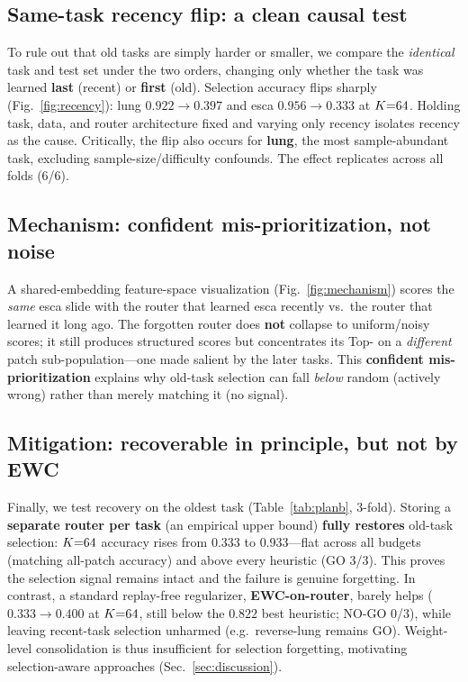 \subsection{Same-task recency flip: a clean causal test}
\label{sec:recency}
To rule out that old tasks are simply harder or smaller, we compare the
\emph{identical} task and test set under the two orders, changing only whether
the task was learned \textbf{last} (recent) or \textbf{first} (old). Selection
accuracy flips sharply (Fig.~\ref{fig:recency}): lung $0.922\to0.397$ and esca
$0.956\to0.333$ at $K{=}64$. Holding task, data, and router architecture fixed
and varying only recency isolates recency as the cause. Critically, the flip
also occurs for \textbf{lung}, the most sample-abundant task, excluding
sample-size/difficulty confounds. The effect replicates across all folds (6/6).

\subsection{Mechanism: confident mis-prioritization, not noise}
A shared-embedding feature-space visualization (Fig.~\ref{fig:mechanism}) scores
the \emph{same} esca slide with the router that learned esca recently vs.\ the
router that learned it long ago. The forgotten router does \textbf{not} collapse
to uniform/noisy scores; it still produces structured scores but concentrates
its Top-\K{} on a \emph{different} patch sub-population---one made salient by the
later tasks. This \textbf{confident mis-prioritization} explains why old-task
selection can fall \emph{below} random (actively wrong) rather than merely
matching it (no signal).

\subsection{Mitigation: recoverable in principle, but not by EWC}
\label{sec:mitigation}
Finally, we test recovery on the oldest task (Table~\ref{tab:planb}, 3-fold).
Storing a \textbf{separate router per task} (an empirical upper bound)
\textbf{fully restores} old-task selection: $K{=}64$ accuracy rises from
$0.333$ to $\mathbf{0.933}$---flat across all budgets (matching all-patch
accuracy) and above every heuristic (GO 3/3). This proves the selection signal
remains intact and the failure is genuine forgetting. In contrast, a standard
replay-free regularizer, \textbf{EWC-on-router}, barely helps
($0.333\to0.400$ at $K{=}64$, still below the $0.822$ best heuristic; NO-GO
0/3), while leaving recent-task selection unharmed (e.g.\ reverse-lung remains
GO). Weight-level consolidation is thus insufficient for selection forgetting,
motivating selection-aware approaches (Sec.~\ref{sec:discussion}).


